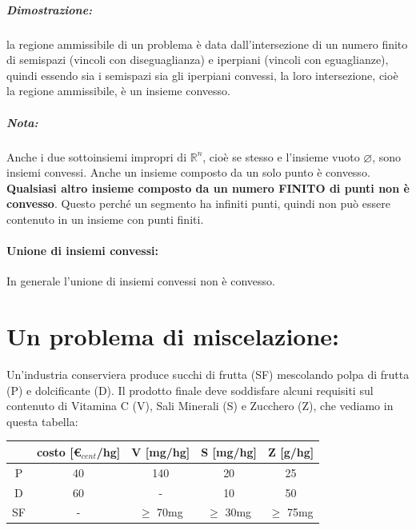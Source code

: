 \subparagraph{Dimostrazione:} la regione ammissibile di un problema è data dall'intersezione di un numero finito di semispazi (vincoli con diseguaglianza) e iperpiani (vincoli con eguaglianze), quindi essendo sia i semispazi sia gli iperpiani convessi, la loro intersezione, cioè la regione ammissibile, è un insieme convesso.

\subparagraph{Nota:} Anche i due sottoinsiemi impropri di $\mathbb{R}^n$, cioè se stesso e l'insieme vuoto $\varnothing$, sono insiemi convessi. Anche un insieme composto da un solo punto è convesso. \textbf{Qualsiasi altro insieme composto da un numero FINITO di punti non è convesso}. Questo perché un segmento ha infiniti punti, quindi non può essere contenuto in un insieme con punti finiti.


\paragraph{Unione di insiemi convessi:} In generale l'unione di insiemi convessi non è convesso.


\section{Un problema di miscelazione:} Un'industria conserviera produce succhi di frutta (SF) mescolando polpa di frutta (P) e dolcificante (D). Il prodotto finale deve soddisfare alcuni requisiti sul contenuto di Vitamina C (V), Sali Minerali (S) e Zucchero (Z), che vediamo in questa tabella:
\begin{table}[h!]
    \centering
    \begin{tabular}{|c|c|c|c|c|}
    \hline
    & costo [\euro$_{cent}$/hg] & V [mg/hg] & S [mg/hg] & Z [g/hg]\\
    \hline
    P & 40 & 140 & 20 & 25\\
    \hline
    D & 60 & - & 10 & 50\\
    \hline
    SF & - & $\geq$ 70mg & $\geq$ 30mg & $\geq$ 75mg\\
    \hline
    \end{tabular}
\end{table}

